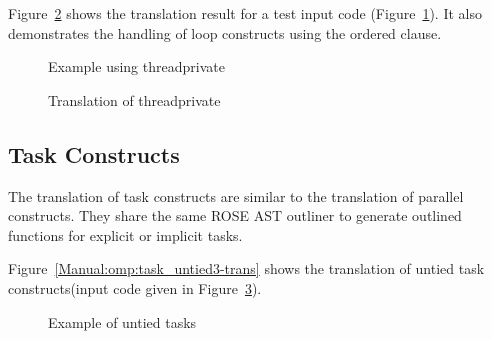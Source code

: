 Figure~\ref{Manual:omp:threadprivate-trans} shows the translation result for a test input code (Figure~\ref{Manual:omp:threadprivate}). It also demonstrates the handling of loop constructs using the ordered clause.

\lstset{language=C,basicstyle=\scriptsize}
\begin{figure}[htbp]
{\indent
  {\mySmallFontSize
    \begin{latexonly}
    
    \end{latexonly}
    \begin{htmlonly}
    
    \end{htmlonly}
  }
}
\caption{Example using threadprivate}
\label{Manual:omp:threadprivate}
\end{figure}

\begin{figure}[htbp]
{\indent
  {\mySmallFontSize
    \begin{latexonly}
    
    \end{latexonly}
    \begin{htmlonly}
    
    \end{htmlonly}
  }
}
\caption{Translation of threadprivate}
\label{Manual:omp:threadprivate-trans}
\end{figure}


\clearpage
\subsection{Task Constructs}
The translation of task constructs are similar to the translation of parallel constructs. 
They share the same ROSE AST outliner to generate outlined functions for
explicit or implicit tasks.

Figure~\ref{Manual:omp:task_untied3-trans} shows the translation of untied task constructs(input code given in
Figure~\ref{Manual:omp:task_untied3}). 

\lstset{language=C,basicstyle=\scriptsize}
\begin{figure}[htbp]
{\indent
  {\mySmallFontSize
    \begin{latexonly}
    
    \end{latexonly}
    \begin{htmlonly}
    
    \end{htmlonly}
  }
}
\caption{Example of untied tasks}
\label{Manual:omp:task_untied3}
\end{figure}

